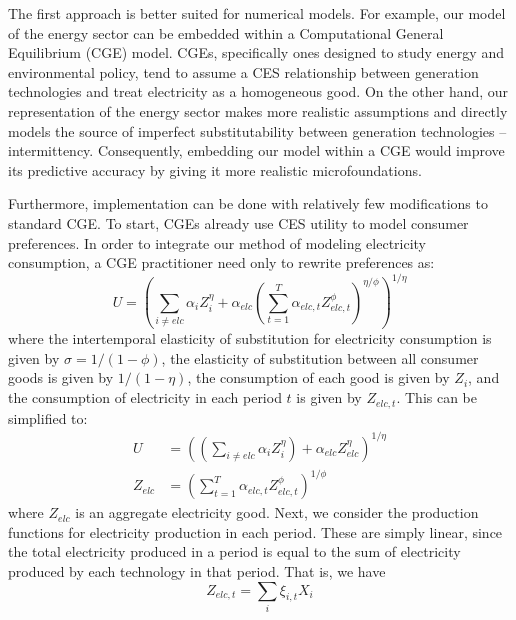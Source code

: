 \documentclass[11pt,a4paper]{extarticle}
\begin{document}
The first approach is better suited for numerical models. For example, our model of the energy sector can be embedded within a Computational General Equilibrium (CGE) model. CGEs, specifically ones designed to study energy and environmental policy, tend to assume a CES relationship between generation technologies and treat electricity as a homogeneous good. On the other hand, our representation of the energy sector makes more realistic assumptions and directly models the source of imperfect substitutability between generation technologies -- intermittency. Consequently, embedding our model within a CGE would improve its predictive accuracy by giving it more realistic microfoundations. 

Furthermore, implementation can be done with relatively few modifications to standard CGE. To start, CGEs already use CES utility to model consumer preferences. In order to integrate our method of modeling electricity consumption, a CGE practitioner need only to rewrite preferences as:
\begin{equation}
U =   \left( \sum_{i \neq elc} \alpha_{i} Z_{i}^\eta +  \alpha_{elc} \left( \sum_{t=1}^T \alpha_{elc,t} Z_{elc, t}^\phi \right)^{\eta/\phi} \right)^{1/\eta}
\end{equation}
where the intertemporal elasticity of substitution for electricity consumption is given by $\sigma = 1/(1-\phi)$,  the elasticity of substitution between all consumer goods is given by $1/(1-\eta)$, the consumption of each good is given by $Z_{i}$, and the consumption of electricity in each period $t$ is given by $Z_{elc, t}$. This can be simplified to: 
\begin{align}
U &= \left(  \left( \sum_{i \neq elc} \alpha_{i} Z_{i}^\eta \right) + \alpha_{elc} Z_{elc}^\eta \right)^{1/\eta} \\
Z_{elc} &= \left(  \sum_{t=1}^T \alpha_{elc,t} Z_{elc, t}^\phi \right)^{1/\phi}
\end{align}
where $Z_{elc}$ is an aggregate electricity good. Next, we consider the production functions for electricity production in each period. These are simply linear, since the total  electricity produced in a period is equal to the sum of electricity produced by each technology in that period. That is, we have 
\begin{equation}
Z_{elc,t} = \sum_i \xi_{i,t} X_i 
\end{equation}
\end{document}
